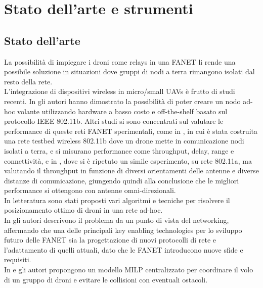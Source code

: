  \chapter{Stato dell'arte e strumenti} \label{chap:strumenti}

\ifpdf
    \graphicspath{{Chapter4/Figs/Raster/}{Chapter4/Figs/PDF/}{Chapter4/Figs/}}
\else
    \graphicspath{{Chapter4/Figs/Vector/}{Chapter4/Figs/}}
\fi

\section{Stato dell'arte}
La possibilità di impiegare i droni come relays in una FANET li rende una possibile soluzione in situazioni dove gruppi di nodi a terra rimangono isolati dal resto della rete. \\
L'integrazione di dispositivi wireless in micro/small UAVs è frutto di studi recenti. In \cite{brown2004ad} gli autori hanno dimostrato la possibilità di poter creare un nodo ad-hoc volante utilizzando hardware a basso costo e off-the-shelf basato sul protocollo IEEE 802.11b. 
Altri studi si sono concentrati sul valutare le performance di queste reti FANET sperimentali, come in \cite{brown2004test}, in cui è stata costruita una rete testbed wireless 802.11b dove un drone mette in comunicazione nodi isolati a terra, e si misurano performance come throughput, delay, range e connettività, e in \cite{4067672}, dove si è ripetuto un simile esperimento, su rete 802.11a, ma valutando il throughput in funzione di diversi orientamenti delle antenne e diverse distanze di comunicazione, giungendo quindi alla conclusione che le migliori performance si ottengono con antenne omni-direzionali.  \\
In letteratura sono stati proposti vari algoritmi e tecniche per risolvere il posizionamento ottimo di droni in una rete ad-hoc. \\
In \cite{Sahingoz2014, 6477822} gli autori descrivono il problema da un punto di vista del networking, affermando che una delle principali key enabling technologies per lo sviluppo futuro delle FANET sia la progettazione di nuovi protocolli di rete e l'adattamento di quelli attuali, dato che le FANET introducono nuove sfide e requisiti. \\
In \cite{1023918} e \cite{Burdakov2010} gli autori propongono un modello MILP centralizzato per coordinare il volo di un gruppo di droni e evitare le collisioni con eventuali ostacoli. \\
